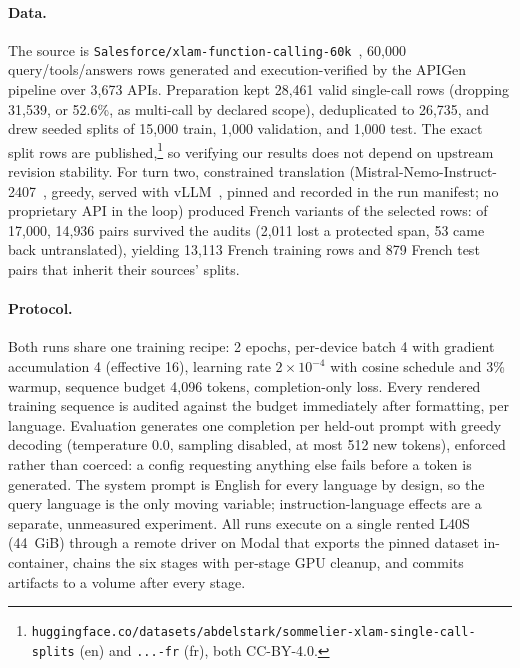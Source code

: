 \documentclass{article}
\begin{document}
\paragraph{Data.}
The source is \texttt{Salesforce/xlam-function-calling-60k}~\citep{liu2024apigen}, 60{,}000 query/tools/answers rows generated and execution-verified by the APIGen pipeline over 3{,}673 APIs. Preparation kept 28{,}461 valid single-call rows (dropping 31{,}539, or 52.6\%, as multi-call by declared scope), deduplicated to 26{,}735, and drew seeded splits of 15{,}000 train, 1{,}000 validation, and 1{,}000 test. The exact split rows are published,\footnote{\texttt{huggingface.co/datasets/abdelstark/sommelier-xlam-single-call-splits} (en) and \texttt{...-fr} (fr), both CC-BY-4.0.} so verifying our results does not depend on upstream revision stability. For turn two, constrained translation (Mistral-Nemo-Instruct-2407~\citep{mistral2024nemo}, greedy, served with vLLM~\citep{kwon2023vllm}, pinned and recorded in the run manifest; no proprietary API in the loop) produced French variants of the selected rows: of 17{,}000, 14{,}936 pairs survived the audits (2{,}011 lost a protected span, 53 came back untranslated), yielding 13{,}113 French training rows and 879 French test pairs that inherit their sources' splits.

\paragraph{Protocol.}
Both runs share one training recipe: 2 epochs, per-device batch 4 with gradient accumulation 4 (effective 16), learning rate $2 \times 10^{-4}$ with cosine schedule and 3\% warmup, sequence budget 4{,}096 tokens, completion-only loss. Every rendered training sequence is audited against the budget immediately after formatting, per language. Evaluation generates one completion per held-out prompt with greedy decoding (temperature 0.0, sampling disabled, at most 512 new tokens), enforced rather than coerced: a config requesting anything else fails before a token is generated. The system prompt is English for every language by design, so the query language is the only moving variable; instruction-language effects are a separate, unmeasured experiment. All runs execute on a single rented L40S (44~GiB) through a remote driver on Modal that exports the pinned dataset in-container, chains the six stages with per-stage GPU cleanup, and commits artifacts to a volume after every stage.
\end{document}
